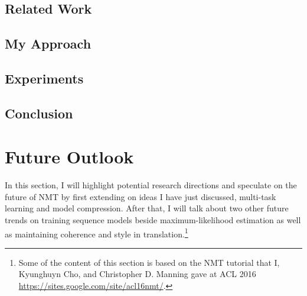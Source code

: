 \subsection{Related Work}
\label{subsec:related}



\subsection{My Approach}
\label{subsec:approach}


\subsection{Experiments}
\label{subsec:exp}


\subsection{Conclusion}
\label{subsec:conclusion}


\section{Future Outlook}
\label{sec:outlook}
In this section, I will highlight potential research directions and speculate on the future of NMT by first extending on ideas I have just discussed, multi-task learning and model compression. After that, I will talk about two other future trends on training sequence models beside maximum-likelihood estimation as well as maintaining coherence and style in translation.\footnote{Some of the content of this section is based on the NMT tutorial that I, Kyunghuyn Cho, and Christopher D. Manning gave at ACL 2016 \url{https://sites.google.com/site/acl16nmt/}.}

